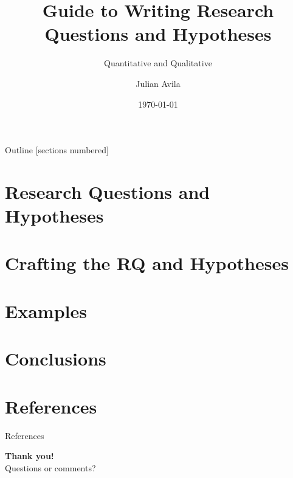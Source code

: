\documentclass[aspectratio=169,sn-mathphys-num]{beamer}
\title{Guide to Writing Research Questions and Hypotheses}
\subtitle{Quantitative and Qualitative}
\author{Julian Avila}
\institute{Universidad Distrital Francisco José de Caldas}
\date{\today}
\begin{document}
\begin{frame}
	\titlepage
\end{frame}

\begin{frame}{Outline}
	[sections numbered]
	\tableofcontents
\end{frame}

\section{Research Questions and Hypotheses}%
\label{sec:Research Questions and Hypotheses}



\section{Crafting the RQ and Hypotheses}%
\label{sec:Crafting the RQ and Hypotheses}



\section{Examples}%
\label{sec:Examples}



\section{Conclusions}%
\label{sec:Conclusions}



\section{References}
\begin{frame}[allowframebreaks]{References}
	\printbibliography
	\nocite{*}
\end{frame}

\begin{frame}[plain]
\centering
\vspace{1cm}
{\Huge \textbf{Thank you!}}\\[1cm]
{\large Questions or comments?}
\end{frame}
\end{document}
